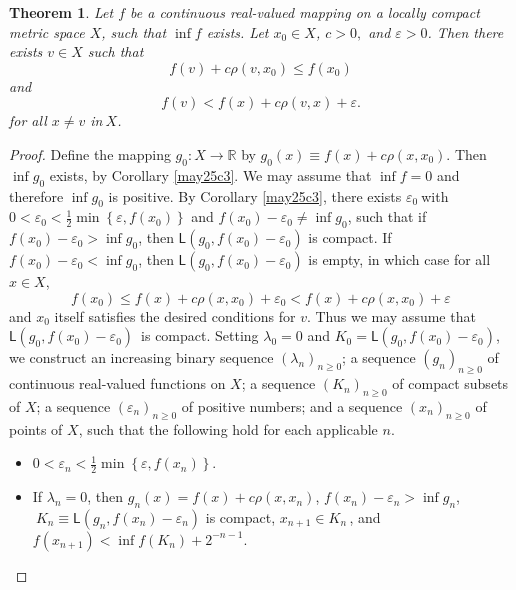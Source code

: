\documentclass[10pt,a4paper]{amsart}
\newtheorem{theorem}{Theorem}
\begin{document}
\begin{theorem}
\label{Ekeland}Let $f$ be a continuous real-valued mapping on a locally
compact metric space $X$, such that $\inf f$ exists. Let $x_{0}\in X$, $c>0,$
and $\varepsilon>0$. Then there exists $v\in X$ such that%
\begin{equation}
f(v)+c\rho\left(  v,x_{0}\right)  \leqslant f\left(  x_{0}\right)  \label{1}%
\end{equation}
and%
\begin{equation}
f\left(  v\right)  <f(x)+c\rho\left(  v,x\right)  +\varepsilon. \label{2}%
\end{equation}
for all $x\neq v$ in$\ X$.
\end{theorem}

\begin{proof}
Define the mapping $g_{0}:X\rightarrow\mathbb{R}$ by $g_{0}(x)\equiv
f(x)+c\rho(x,x_{0})$. Then $\inf g_{0}$ exists, by Corollary \ref{may25c3}. We
may assume that $\inf f=0$ and therefore $\inf g_{0}$ is positive. By
Corollary \ref{may25c3}, there exists $\varepsilon_{0}\ $with $0<\varepsilon
_{0}<\frac{1}{2}\min\left\{  \varepsilon,f(x_{0})\right\}  $ and
$f(x_{0})-\varepsilon_{0}\neq\inf g_{0}$, such that if $f(x_{0})-\varepsilon
_{0}>\inf g_{0}$, then $\mathsf{L}(g_{0},f(x_{0})-\varepsilon_{0})$ is
compact. If $f(x_{0})-\varepsilon_{0}<\inf g_{0}$, then $\mathsf{L}%
(g_{0},f(x_{0})-\varepsilon_{0})$ is empty, in which case for all $x\in X$,
\[
f(x_{0})\leqslant f(x)+c\rho(x,x_{0})+\varepsilon_{0}<f(x)+c\rho
(x,x_{0})+\varepsilon
\]
and $x_{0}$ itself satisfies the desired conditions for $v$. Thus we may
assume that $\mathsf{L}(g_{0},f(x_{0})-\varepsilon_{0})$\ is compact. Setting
$\lambda_{0}=0$ and $K_{0}=\mathsf{L}(g_{0},f(x_{0})-\varepsilon_{0})$, we
construct an increasing binary sequence $\left(  \lambda_{n}\right)
_{n\geqslant0}$; a sequence $\left(  g_{n}\right)  _{n\geqslant0} $ of
continuous real-valued functions on $X$; a sequence $\left(  K_{n}\right)
_{n\geqslant0}$ of compact subsets of $X$; a sequence $\left(  \varepsilon
_{n}\right)  _{n\geqslant0}$ of positive numbers; and a sequence $\left(
x_{n}\right)  _{n\geqslant0}$ of points of $X$, such that the following hold
for each applicable $n$.

\begin{itemize}
\item[(a)] $0<\varepsilon_{n}<\frac{1}{2}\min\left\{  \varepsilon
,f(x_{n})\right\}  $.

\item[(b)] If $\lambda_{n}=0$, then $g_{n}(x)=f(x)+c\rho(x,x_{n})$,
$f(x_{n})-\varepsilon_{n}>\inf g_{n}$,$\ K_{n}\equiv\mathsf{L}(g_{n}%
,f(x_{n})-\varepsilon_{n})$ is compact, $x_{n+1}\in K_{n}\,$, and
$f(x_{n+1})<\inf f(K_{n})+2^{-n-1}$.


\end{itemize}
\end{proof}
\end{document}
